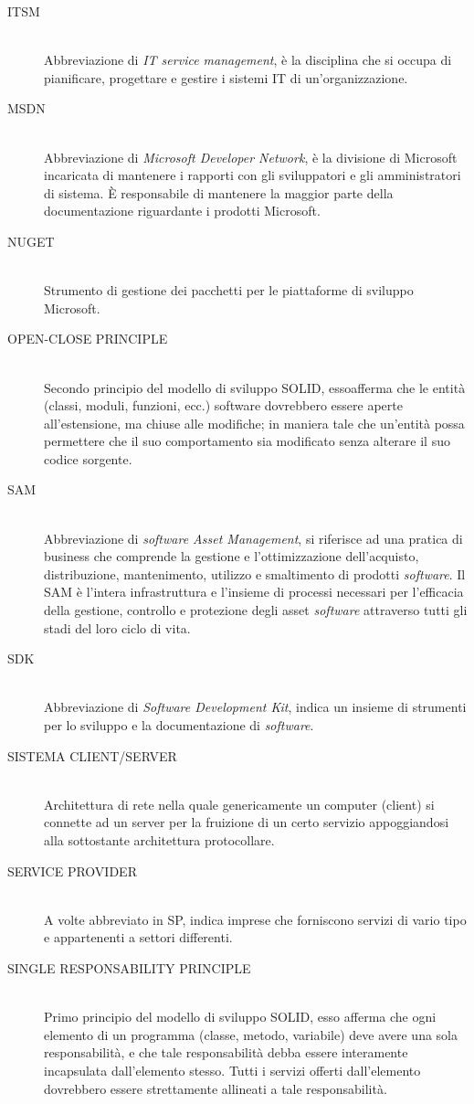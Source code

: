\begin{description}
\item[ITSM] \hfill \\ Abbreviazione di \emph{IT service management}, è la disciplina che si occupa di pianificare, progettare e gestire i sistemi IT di un'organizzazione.
\item[MSDN] \hfill \\ Abbreviazione di \emph{ Microsoft Developer Network}, è la divisione di Microsoft incaricata di mantenere i rapporti con gli sviluppatori e gli amministratori di sistema. È responsabile di mantenere la maggior parte della documentazione riguardante i prodotti Microsoft.
\item[NUGET] \hfill \\ Strumento di gestione dei pacchetti per le piattaforme di sviluppo Microsoft.  
\item[OPEN-CLOSE PRINCIPLE] \hfill \\ Secondo principio del modello di sviluppo SOLID, essoafferma che le entità (classi, moduli, funzioni, ecc.) software dovrebbero essere aperte all'estensione, ma chiuse alle modifiche; in maniera tale che un'entità possa permettere che il suo comportamento sia modificato senza alterare il suo codice sorgente.
\item[SAM] \hfill \\ Abbreviazione di \emph{software Asset Management}, si riferisce ad una pratica di business che comprende la gestione e l’ottimizzazione
dell’acquisto, distribuzione, mantenimento, utilizzo e smaltimento di prodotti \emph{software}. Il SAM è l’intera infrastruttura e l’insieme di
processi necessari per l’efficacia della gestione, controllo e protezione degli asset
\emph{software} attraverso tutti gli stadi del loro ciclo di vita. 
\item[SDK] \hfill \\ Abbreviazione di \emph{Software Development Kit}, indica un insieme di strumenti per lo sviluppo e la documentazione di \emph{software}. \item[SISTEMA CLIENT/SERVER] \hfill \\  Architettura di rete nella quale genericamente un computer (client) si connette ad un server per la fruizione di un certo servizio appoggiandosi alla sottostante architettura protocollare.
\item[SERVICE PROVIDER] \hfill \\ A volte abbreviato in SP, indica imprese che forniscono servizi di vario tipo e appartenenti a settori differenti. 
\item[SINGLE RESPONSABILITY PRINCIPLE] \hfill \\ Primo principio del modello di sviluppo SOLID, esso afferma che ogni elemento di un programma (classe, metodo, variabile) deve avere una sola responsabilità, e che tale responsabilità debba essere interamente incapsulata dall'elemento stesso. Tutti i servizi offerti dall'elemento dovrebbero essere strettamente allineati a tale responsabilità. 

\end{description}
